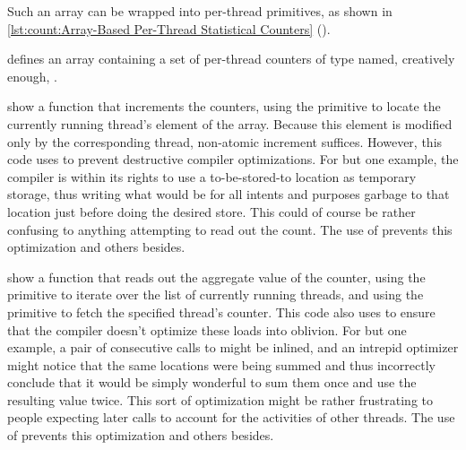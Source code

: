 Such an array can be wrapped into per-thread primitives, as shown in
\cref{lst:count:Array-Based Per-Thread Statistical Counters}
().
\begin{fcvref}
 defines an array containing a set of per-thread counters of
type  named, creatively enough, .

show a function that increments the counters, using the
 primitive to locate the currently running
thread's element of the  array.
Because this element is modified only by the corresponding thread,
non-atomic increment suffices.
However, this code uses  to prevent destructive compiler
optimizations.
For but one example, the compiler is within its rights to use a
to-be-stored-to location as temporary storage, thus writing what
would be for all intents and purposes garbage to that location
just before doing the desired store.
This could of course be rather confusing to anything attempting to
read out the count.
The use of  prevents this optimization and others besides.

\QuickQuizEnd

show a function that reads out the aggregate value of the counter,
using the  primitive to iterate over the list of
currently running threads, and using the  primitive
to fetch the specified thread's counter.
This code also uses  to ensure that the compiler doesn't
optimize these loads into oblivion.
For but one example, a pair of consecutive calls to 
might be inlined, and an intrepid optimizer might notice that the same
locations were being summed and thus incorrectly conclude that it would
be simply wonderful to sum them once and use the resulting value twice.
This sort of optimization might be rather frustrating to people expecting
later  calls to account for the activities of other
threads.
The use of  prevents this optimization and others besides.
\end{fcvref}

